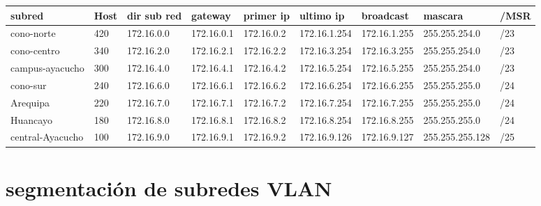 \begin{landscape}
\begin{table}[htbp]
\begin{tabular}{|l|l|l|l|l|l|l|l|l|}
\hline
\rowcolor[HTML]{32CB00} 
\textbf{subred}  & \textbf{Host} & \textbf{dir sub red} & \textbf{gateway} & \textbf{primer ip} & \textbf{ultimo ip} & \textbf{broadcast} & \textbf{mascara} & \textbf{/MSR} \\ \hline
cono-norte       & 420           & 172.16.0.0           & 172.16.0.1       & 172.16.0.2         & 172.16.1.254       & 172.16.1.255       & 255.255.254.0    & /23           \\ \hline
cono-centro      & 340           & 172.16.2.0           & 172.16.2.1       & 172.16.2.2         & 172.16.3.254       & 172.16.3.255       & 255.255.254.0    & /23           \\ \hline
campus-ayacucho  & 300           & 172.16.4.0           & 172.16.4.1       & 172.16.4.2         & 172.16.5.254       & 172.16.5.255       & 255.255.254.0    & /23           \\ \hline
cono-sur         & 240           & 172.16.6.0           & 172.16.6.1       & 172.16.6.2         & 172.16.6.254       & 172.16.6.255       & 255.255.255.0    & /24           \\ \hline
Arequipa         & 220           & 172.16.7.0           & 172.16.7.1       & 172.16.7.2         & 172.16.7.254       & 172.16.7.255       & 255.255.255.0    & /24           \\ \hline
Huancayo         & 180           & 172.16.8.0           & 172.16.8.1       & 172.16.8.2         & 172.16.8.254       & 172.16.8.255       & 255.255.255.0    & /24           \\ \hline
central-Ayacucho & 100           & 172.16.9.0           & 172.16.9.1       & 172.16.9.2         & 172.16.9.126       & 172.16.9.127       & 255.255.255.128  & /25           \\ \hline
\end{tabular}
\end{table}


\end{landscape}


\section{segmentaci\'on de subredes VLAN}

